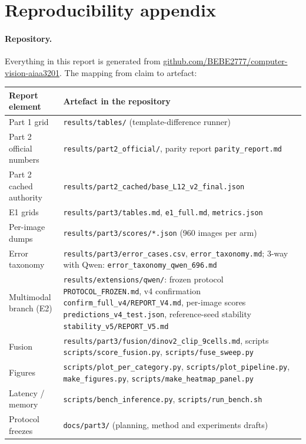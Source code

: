 \section*{Reproducibility appendix}
\label{app:repro}

\paragraph{Repository.}
Everything in this report is generated from
\url{github.com/BEBE2777/computer-vision-aiaa3201}. The mapping from claim to artefact:

\begin{table}[h]
\centering
\small
\begin{tabular}{p{}p{}}
\toprule
Report element & Artefact in the repository \\
\midrule
Part 1 grid & \texttt{results/tables/} (template-difference runner) \\
Part 2 official numbers & \texttt{results/part2\_official/}, parity report \texttt{parity\_report.md} \\
Part 2 cached authority & \texttt{results/part2\_cached/base\_L12\_v2\_final.json} \\
E1 grids & \texttt{results/part3/tables.md}, \texttt{e1\_full.md}, \texttt{metrics.json} \\
Per-image dumps & \texttt{results/part3/scores/*.json} (960 images per arm) \\
Error taxonomy & \texttt{results/part3/error\_cases.csv}, \texttt{error\_taxonomy.md};
3-way with Qwen: \texttt{error\_taxonomy\_qwen\_696.md} \\
Multimodal branch (E2) & \texttt{results/extensions/qwen/}: frozen protocol
\texttt{PROTOCOL\_FROZEN.md}, v4 confirmation \texttt{confirm\_full\_v4/REPORT\_V4.md},
per-image scores \texttt{predictions\_v4\_test.json}, reference-seed stability
\texttt{stability\_v5/REPORT\_V5.md} \\
Fusion & \texttt{results/part3/fusion/dinov2\_clip\_9cells.md}, scripts \texttt{scripts/score\_fusion.py}, \texttt{scripts/fuse\_sweep.py} \\
Figures & \texttt{scripts/plot\_per\_category.py}, \texttt{scripts/plot\_pipeline.py}, \texttt{make\_figures.py}, \texttt{scripts/make\_heatmap\_panel.py} \\
Latency / memory & \texttt{scripts/bench\_inference.py}, \texttt{scripts/run\_bench.sh} \\
Protocol freezes & \texttt{docs/part3/} (planning, method and experiments drafts) \\
\bottomrule
\end{tabular}
\end{table}

